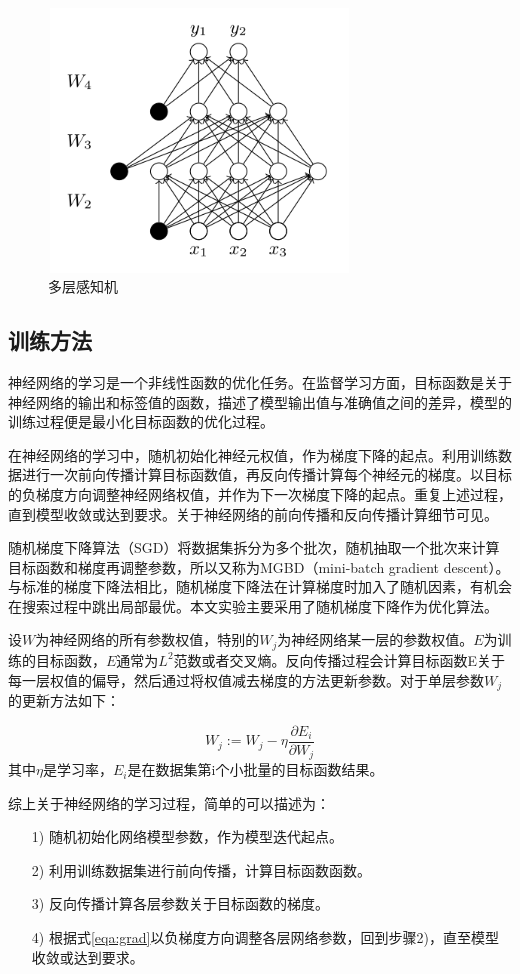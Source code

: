 \documentclass[zihao = -4,cn]{oucart}
\begin{document}
\begin{figure}[h]
	\centering %
	\includegraphics[width=8cm,height=7cm]{assets/MLP}
	\caption{多层感知机}
	\label{fig:MLP}
\end{figure}

\subsection{训练方法}
神经网络的学习是一个非线性函数的优化任务。在监督学习方面，目标函数是关于神经网络的输出和标签值的函数，描述了模型输出值与准确值之间的差异，模型的训练过程便是最小化目标函数的优化过程。\par
在神经网络的学习中，随机初始化神经元权值，作为梯度下降的起点。利用训练数据进行一次前向传播计算目标函数值，再反向传播计算每个神经元的梯度。以目标的负梯度方向调整神经网络权值，并作为下一次梯度下降的起点。重复上述过程，直到模型收敛或达到要求。关于神经网络的前向传播和反向传播计算细节可见\cite{周志华2016机器学习}。\par
随机梯度下降算法（SGD）将数据集拆分为多个批次，随机抽取一个批次来计算目标函数和梯度再调整参数，所以又称为MGBD（mini-batch gradient descent）。与标准的梯度下降法相比，随机梯度下降法在计算梯度时加入了随机因素，有机会在搜索过程中跳出局部最优。本文实验主要采用了随机梯度下降作为优化算法。\par
设$W$为神经网络的所有参数权值，特别的$W_j$为神经网络某一层的参数权值。$E$为训练的目标函数，$E$通常为$L^2$范数或者交叉熵\cite{murphy2012machine}。反向传播过程会计算目标函数E关于每一层权值的偏导，然后通过将权值减去梯度的方法更新参数。对于单层参数$W_j$的更新方法如下：\par
\begin{equation}
W_j := W_j - \eta \frac{\partial E_i}{\partial W_j} \label{eqa:grad}
\end{equation}
其中$\eta$是学习率，$E_i$是在数据集第i个小批量的目标函数结果。\par
综上关于神经网络的学习过程，简单的可以描述为：
\begin{itemize}
	\item [1)]
	随机初始化网络模型参数，作为模型迭代起点。
	\item [2)]
	利用训练数据集进行前向传播，计算目标函数函数。
	\item [3)]
	反向传播计算各层参数关于目标函数的梯度。
	\item [4)]
	根据式\ref{eqa:grad}以负梯度方向调整各层网络参数，回到步骤2)，直至模型收敛或达到要求。
\end{itemize}
\par
\end{document}
